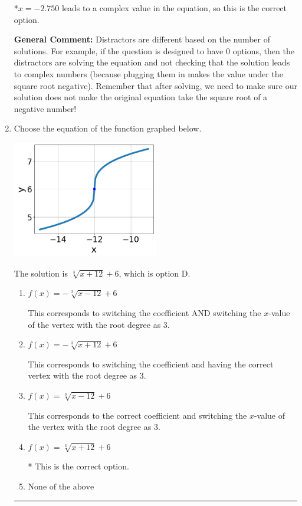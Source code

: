 \documentclass{extbook}[14pt]
\newcommand{\litem}[1]{\item #1

\rule{\textwidth}{0.4pt}}
\begin{document}
\begin{enumerate}
{\begin{enumerate}[label=\Alph*.]
*$x = -2.750$ leads to a complex value in the equation, so this is the correct option.
\end{enumerate}

\textbf{General Comment:} Distractors are different based on the number of solutions. For example, if the question is designed to have 0 options, then the distractors are solving the equation and not checking that the solution leads to complex numbers (because plugging them in makes the value under the square root negative). Remember that after solving, we need to make sure our solution does not make the original equation take the square root of a negative number!
}
\litem{
Choose the equation of the function graphed below.

\begin{center}
    \includegraphics[width=0.5\textwidth]{../Figures/radicalGraphToEquationCopyB.png}
\end{center}


The solution is \( \sqrt[3]{x + 12} + 6 \), which is option D.\begin{enumerate}[label=\Alph*.]
\item \( f(x) = - \sqrt[3]{x - 12} + 6 \)

This corresponds to switching the coefficient AND switching the $x$-value of the vertex with the root degree as $3$.
\item \( f(x) = - \sqrt[3]{x + 12} + 6 \)

This corresponds to switching the coefficient and having the correct vertex with the root degree as $3$.
\item \( f(x) = \sqrt[3]{x - 12} + 6 \)

This corresponds to the correct coefficient and switching the $x$-value of the vertex with the root degree as $3$.
\item \( f(x) = \sqrt[3]{x + 12} + 6 \)

* This is the correct option.
\item \( \text{None of the above} \)


\end{enumerate}}
\end{enumerate}
\end{document}
